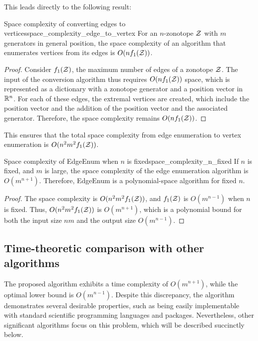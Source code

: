 This leads directly to the following result:

\begin{theorembox}{Space complexity of converting edges to vertices}{space_complexity_edge_to_vertex}
    For an $n$-zonotope $\mathcal{Z}$ with $m$ generators in general position, the space complexity of an algorithm that enumerates vertices from its edges is $O(nf_1(\mathcal{Z}))$.
\end{theorembox}
\begin{proof}
    Consider $f_1(\mathcal{Z})$, the maximum number of edges of a zonotope $\mathcal{Z}$. The input of the conversion algorithm thus requires $O(nf_1(\mathcal{Z}))$ space, which is represented as a dictionary with a zonotope generator and a position vector in $\mathbb{R}^n$. For each of these edges, the extremal vertices are created, which include the position vector and the addition of the position vector and the associated generator. Therefore, the space complexity remains $O(nf_1(\mathcal{Z}))$.
\end{proof}

This ensures that the total space complexity from edge enumeration to vertex enumeration is $O(n^2m^2f_1(\mathcal{Z}))$.

\begin{theorembox}{Space complexity of EdgeEnum when $n$ is fixed}{space_complexity_n_fixed}
    If $n$ is fixed, and $m$ is large, the space complexity of the edge enumeration algorithm is $O(m^{n+1})$. Therefore, EdgeEnum is a polynomial-space algorithm for fixed $n$.
\end{theorembox}
\begin{proof}
    The space complexity is $O(n^2m^2f_1(\mathcal{Z}))$, and $f_1(\mathcal{Z})$ is $O(m^{n-1})$ when $n$ is fixed. Thus, $O(n^2m^2f_1(\mathcal{Z}))$ is $O(m^{n+1})$, which is a polynomial bound for both the input size $nm$ and the output size $O(m^{n-1})$.
\end{proof}

\subsection{Time-theoretic comparison with other algorithms}

The proposed algorithm exhibits a time complexity of $O(m^{n+1})$, while the optimal lower bound is $O(m^{n-1})$. Despite this discrepancy, the algorithm demonstrates several desirable properties, such as being easily implementable with standard scientific programming languages and packages. Nevertheless, other significant algorithms focus on this problem, which will be described succinctly below.


